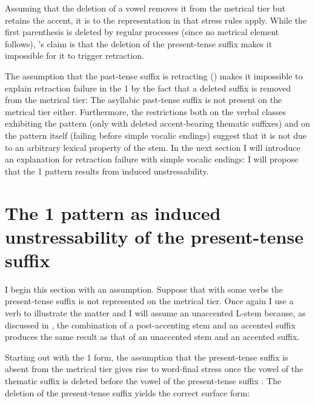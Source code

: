 \documentclass[output=paper,colorlinks,citecolor=black,koreanfont]{langscibook}
\begin{document}
\noindent Assuming that the deletion of a vowel removes it from the metrical tier but retains the accent, it is to the representation in  that stress rules apply. While the first parenthesis is deleted by regular processes (since no metrical element follows), \citeauthor{Idsardi1992}’s claim is that the deletion of the present-tense suffix makes it impossible for it to trigger retraction.

The assumption that the past-tense suffix  is retracting () makes it impossible to explain retraction failure in the {1\SG} by the fact that a deleted suffix is removed from the metrical tier: The asyllabic past-tense suffix is not present on the metrical tier either. Furthermore, the restrictions both on the verbal classes exhibiting the pattern (only with deleted accent-bearing thematic suffixes) and on the pattern itself (failing before simple vocalic endings) suggest that it is not due to an arbitrary lexical property of the stem. In the next section I will introduce an explanation for retraction failure with simple vocalic endings: I will propose that the {1\SG} pattern results from induced unstressability.

\section{The {1\SG} pattern as induced unstressability of the present-tense suffix}\label{mat:sec:Unstressability}

I begin this section with an assumption. Suppose that with some verbs the present-tense suffix is not represented on the metrical tier. Once again I use a  verb to illustrate the matter and I will assume an unaccented L-stem because, as discussed in , the combination of a post-accenting stem and an accented suffix produces the same result as that of an unaccented stem and an accented suffix.

Starting out with the {1\SG} form, the assumption that the present-tense suffix is absent from the metrical tier  gives rise to word-final stress once the vowel of the thematic suffix is deleted before the vowel of the present-tense suffix . The deletion of the present-tense suffix  yields the correct surface form:\bigskip
\end{document}
